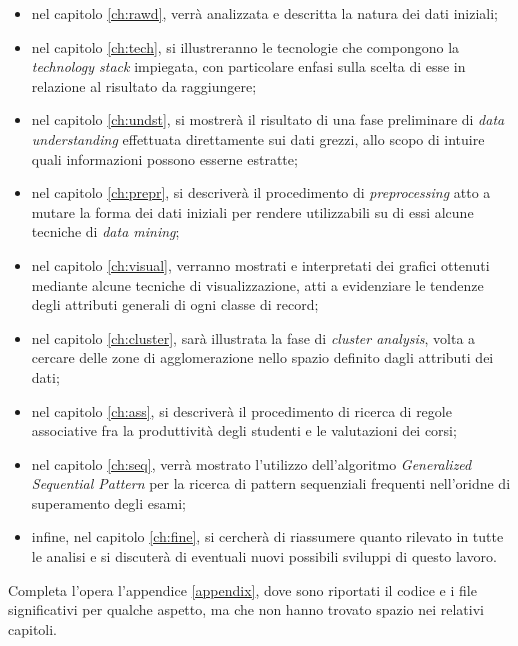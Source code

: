 \begin{itemize}
    \item nel capitolo \ref{ch:rawd}, verrà analizzata e descritta la natura dei dati iniziali;
    \item nel capitolo \ref{ch:tech}, si illustreranno le tecnologie che compongono la \textit{technology stack} impiegata, con particolare enfasi sulla scelta di esse in relazione al risultato da raggiungere;
    \item nel capitolo \ref{ch:undst}, si mostrerà il risultato di una fase preliminare di \textit{data understanding} effettuata direttamente sui dati grezzi, allo scopo di intuire quali informazioni possono esserne estratte;
    \item nel capitolo \ref{ch:prepr}, si descriverà il procedimento di \textit{preprocessing} atto a mutare la forma dei dati iniziali per rendere utilizzabili su di essi alcune tecniche di \textit{data mining};
    \item nel capitolo \ref{ch:visual}, verranno mostrati e interpretati dei grafici ottenuti mediante alcune tecniche di visualizzazione, atti a evidenziare le tendenze degli attributi generali di ogni classe di record;
    \item nel capitolo \ref{ch:cluster}, sarà illustrata la fase di \textit{cluster analysis}, volta a cercare delle zone di agglomerazione nello spazio definito dagli attributi dei dati;
    \item nel capitolo \ref{ch:ass}, si descriverà il procedimento di ricerca di regole associative fra la produttività degli studenti e le valutazioni dei corsi;
    \item nel capitolo \ref{ch:seq}, verrà mostrato l'utilizzo dell'algoritmo \textit{Generalized Sequential Pattern} per la ricerca di pattern sequenziali frequenti nell'oridne di superamento degli esami;
    \item infine, nel capitolo \ref{ch:fine}, si cercherà di riassumere quanto rilevato in tutte le analisi e si discuterà di eventuali nuovi possibili sviluppi di questo lavoro.
\end{itemize}

Completa l'opera l'appendice \ref{appendix}, dove sono riportati il codice e i file significativi per qualche aspetto, ma che non hanno trovato spazio nei relativi capitoli.
